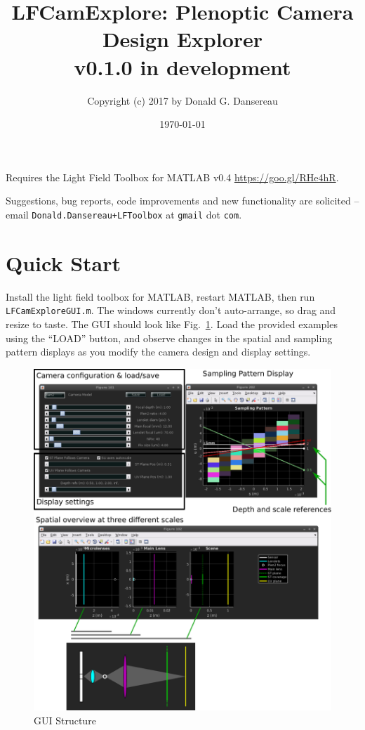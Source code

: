 \documentclass[onecolumn]{article}
\title{
LFCamExplore: Plenoptic Camera Design Explorer\\
{\large v0.1.0 in development }}
\author{Copyright (c) 2017 by Donald G. Dansereau}
\date{\today}
\newcommand{\SymbolText}[1]{\texttt{\small #1}}
\begin{document}
\maketitle
\thispagestyle{empty}\pagestyle{plain}

\noindent
Requires the Light Field Toolbox for MATLAB v0.4 \url{https://goo.gl/RHe4hR}.

\vspace{1em}\noindent 
Suggestions, bug reports, code improvements and new functionality are solicited -- email \SymbolText{Donald.Dansereau+LFToolbox} \small{at} \SymbolText{gmail} \small{dot} \SymbolText{com}.


\newpage
\tableofcontents
\newpage

\section{Quick Start}

Install the light field toolbox for MATLAB, restart MATLAB, then run \SymbolText{LFCamExploreGUI.m}.  The windows currently don't auto-arrange, so drag and resize to taste.  The GUI should look like Fig.~\ref{fig_AnnotatedScreenshot}.  Load the provided examples using the ``LOAD'' button, and observe changes in the spatial and sampling pattern displays as you modify the camera design and display settings.

\begin{figure}[h!]
	\centering
	\includegraphics[width=1\textwidth]{Figs/AnnotatedScreenshot}
	\caption{GUI Structure}
	\label{fig_AnnotatedScreenshot}
\end{figure}
\end{document}
